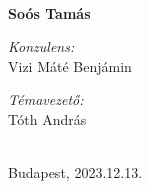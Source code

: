 \begin{titlepage}
	{\Huge  \scshape 
	}\\[0.4em] %
	
	
	\vspace{3em}
	
	{\LARGE \bfseries
		Soós Tamás
	}
	
	\vfill %
	
	
	\begin{minipage}[t]{0.45\textwidth}
	\begin{flushleft}\large
   	\emph{Konzulens:}  \\
    Vizi Máté Benjámin
	\end{flushleft}
	\end{minipage}
	\begin{minipage}[t]{0.45\textwidth}
	\begin{flushright}\large
	\emph{Témavezető:}  \\
	Tóth András
	\\ %
	\end{flushright}
	\end{minipage}\\[3em]
	
	

	{\large
		Budapest, 2023.12.13.}\\[2em] %
	
	
	
	
\end{titlepage}